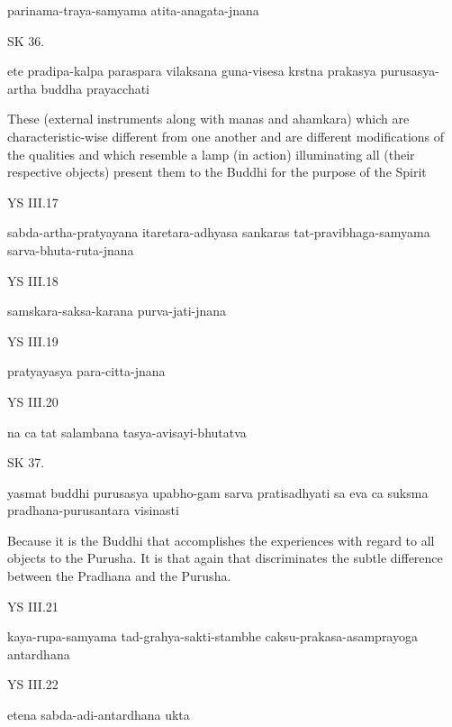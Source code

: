     parinama-traya-samyama atita-anagata-jnana


SK 36.

ete pradipa-kalpa paraspara vilaksana guna-visesa
krstna prakasya purusasya-artha buddha prayacchati

These (external instruments along with manas and ahamkara)
which are characteristic-wise different from one another
and are different modifications of the qualities
and which resemble a lamp (in action)
illuminating all (their respective objects)
present them to the Buddhi for the purpose of the Spirit

YS III.17

    sabda-artha-pratyayana itaretara-adhyasa sankaras
    tat-pravibhaga-samyama sarva-bhuta-ruta-jnana

YS III.18

    samskara-saksa-karana purva-jati-jnana

YS III.19

    pratyayasya para-citta-jnana

YS III.20

    na ca tat salambana tasya-avisayi-bhutatva

SK 37.

yasmat buddhi purusasya upabho-gam sarva pratisadhyati
sa eva ca suksma pradhana-purusantara visinasti

Because it is the Buddhi that accomplishes the experiences
with regard to all objects to the Purusha.
It is that again that discriminates the subtle difference
between the Pradhana and the Purusha.

YS III.21

    kaya-rupa-samyama tad-grahya-sakti-stambhe
    caksu-prakasa-asamprayoga antardhana

YS III.22

    etena sabda-adi-antardhana ukta

